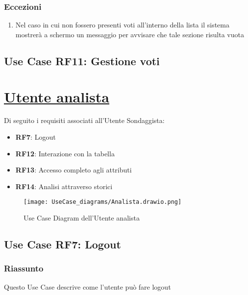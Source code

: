         \subsubsection{Eccezioni}
            \begin{enumerate}
                \item Nel caso in cui non fossero presenti voti all'interno della lista il sistema mostrerà a schermo un messaggio per avvisare che tale sezione risulta vuota
            \end{enumerate}

    \subsection{Use Case RF11: Gestione voti}


\section{\underline{Utente analista}}
    Di seguito i requisiti associati all'Utente Sondaggista:
    \begin{itemize}
        \item \textbf{RF7}: Logout
        \item \textbf{RF12}: Interazione con la tabella
        \item \textbf{RF13}: Accesso completo agli attributi
        \item \textbf{RF14}: Analisi attraverso storici
    \end{itemize}
    \begin{figure}[H]
        \centering
        \texttt{[image: UseCase\_diagrams/Analista.drawio.png]}
        \caption{Use Case Diagram dell'Utente analista}
    \end{figure}

    \subsection{Use Case RF7: Logout}
        \subsubsection{Riassunto}
            Questo Use Case descrive come l'utente può fare logout
